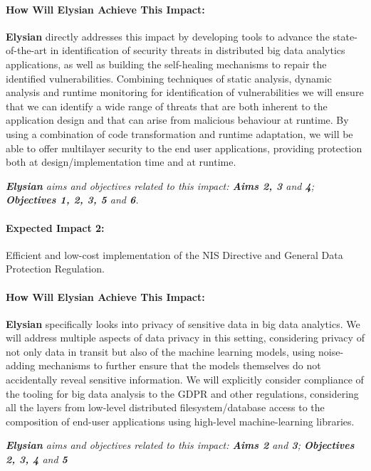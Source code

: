 \documentclass[a4paper,11pt]{article}
\newcommand{\project}[1]{\textbf{#1}\xspace}
\newcommand{\SECURITY}{\project{Elysian}}
\newcommand{\TheProject}{\SECURITY}
\begin{document}
\begin{mdframed}[backgroundcolor=gray!10]
\paragraph{How Will \TheProject{} Achieve This Impact:}
\TheProject{} directly addresses this impact by developing tools to advance the state-of-the-art in identification of security threats in distributed big data analytics applications, as well as building the self-healing mechanisms to repair the identified vulnerabilities. Combining techniques of static analysis, dynamic analysis and runtime monitoring for identification of vulnerabilities we will ensure that we can identify a wide range of threats that are both inherent to the application design and that can arise from malicious behaviour at runtime. By using a combination of code transformation and runtime adaptation, we will be able to offer multilayer security to the end user applications, providing protection both at design/implementation time and at runtime.

\emph{\TheProject{} aims and objectives related to this impact: \textbf{Aims 2, 3 } and \textbf{4}; \textbf{Objectives 1, 2, 3, 5} and \textbf{6}.}
\end{mdframed}

\begin{mdframed}[backgroundcolor=blue!5]
\paragraph{Expected Impact 2:}
Efficient and low-cost implementation of the NIS Directive and General Data Protection Regulation.
\end{mdframed}

\begin{mdframed}[backgroundcolor=gray!10]
\paragraph{How Will \TheProject{} Achieve This Impact:}
\TheProject{} specifically looks into privacy of sensitive data in big data analytics. We will address multiple aspects of data privacy in this setting, considering privacy of not only data in transit but also of the machine learning models, using noise-adding mechanisms to further ensure that the models themselves do not accidentally reveal sensitive information. We will explicitly consider compliance of the tooling for big data analysis to the GDPR and other regulations, considering all the layers from low-level distributed filesystem/database access to the composition of end-user applications using high-level machine-learning libraries.

\emph{\TheProject{} aims and objectives related to this impact: \textbf{Aims 2}  and \textbf{3}; \textbf{Objectives 2, 3, 4} and \textbf{5} }
\end{mdframed}
\end{document}

